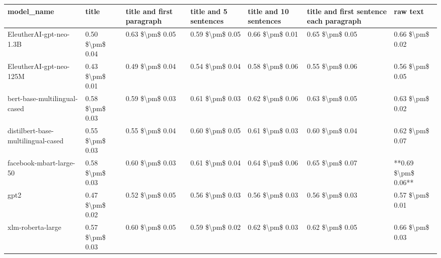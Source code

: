 \begin{tabular}{lllllll}
\toprule
                        model\_name &           title & title and first paragraph & title and 5 sentences & title and 10 sentences & title and first sentence each paragraph &            raw text \\
\midrule
           EleutherAI-gpt-neo-1.3B & 0.50 \$\textbackslash pm\$ 0.04 &           0.63 \$\textbackslash pm\$ 0.05 &       0.59 \$\textbackslash pm\$ 0.05 &        0.66 \$\textbackslash pm\$ 0.01 &                         0.65 \$\textbackslash pm\$ 0.05 &     0.66 \$\textbackslash pm\$ 0.02 \\
           EleutherAI-gpt-neo-125M & 0.43 \$\textbackslash pm\$ 0.01 &           0.49 \$\textbackslash pm\$ 0.04 &       0.54 \$\textbackslash pm\$ 0.04 &        0.58 \$\textbackslash pm\$ 0.06 &                         0.55 \$\textbackslash pm\$ 0.06 &     0.56 \$\textbackslash pm\$ 0.05 \\
      bert-base-multilingual-cased & 0.58 \$\textbackslash pm\$ 0.03 &           0.59 \$\textbackslash pm\$ 0.03 &       0.61 \$\textbackslash pm\$ 0.03 &        0.62 \$\textbackslash pm\$ 0.06 &                         0.63 \$\textbackslash pm\$ 0.05 &     0.63 \$\textbackslash pm\$ 0.02 \\
distilbert-base-multilingual-cased & 0.55 \$\textbackslash pm\$ 0.03 &           0.55 \$\textbackslash pm\$ 0.04 &       0.60 \$\textbackslash pm\$ 0.05 &        0.61 \$\textbackslash pm\$ 0.03 &                         0.60 \$\textbackslash pm\$ 0.04 &     0.62 \$\textbackslash pm\$ 0.07 \\
           facebook-mbart-large-50 & 0.58 \$\textbackslash pm\$ 0.03 &           0.60 \$\textbackslash pm\$ 0.03 &       0.61 \$\textbackslash pm\$ 0.04 &        0.64 \$\textbackslash pm\$ 0.06 &                         0.65 \$\textbackslash pm\$ 0.07 & **0.69 \$\textbackslash pm\$ 0.06** \\
                              gpt2 & 0.47 \$\textbackslash pm\$ 0.02 &           0.52 \$\textbackslash pm\$ 0.05 &       0.56 \$\textbackslash pm\$ 0.03 &        0.56 \$\textbackslash pm\$ 0.03 &                         0.56 \$\textbackslash pm\$ 0.03 &     0.57 \$\textbackslash pm\$ 0.01 \\
                 xlm-roberta-large & 0.57 \$\textbackslash pm\$ 0.03 &           0.60 \$\textbackslash pm\$ 0.05 &       0.59 \$\textbackslash pm\$ 0.02 &        0.62 \$\textbackslash pm\$ 0.03 &                         0.62 \$\textbackslash pm\$ 0.05 &     0.66 \$\textbackslash pm\$ 0.03 \\
\bottomrule
\end{tabular}
